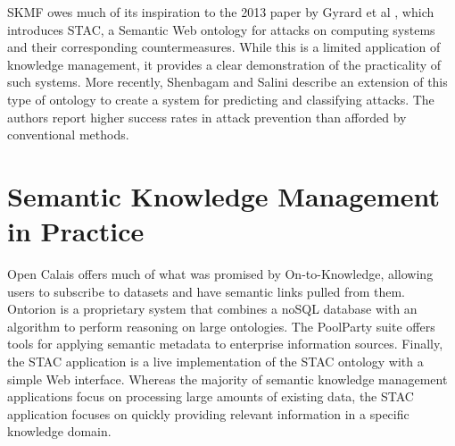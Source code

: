 SKMF owes much of its inspiration to the 2013 paper by Gyrard et al
\cite{ontosec},
which introduces STAC, a Semantic Web ontology for attacks on computing systems and their corresponding countermeasures. While this is a limited application of knowledge management, it provides a clear demonstration of the practicality of such systems. More recently, Shenbagam and Salini
\cite{vulncontol}
describe an extension of this type of ontology to create a system for predicting and classifying attacks. The authors report higher success rates in attack prevention than afforded by conventional methods.


\section{Semantic Knowledge Management in Practice}
\label{applications}

Open Calais
\cite{opencalais}
offers much of what was promised by On-to-Knowledge, allowing users to subscribe to datasets and have semantic links pulled from them. Ontorion
\cite{ontorion}
is a proprietary system that combines a noSQL database with an algorithm to perform reasoning on large ontologies. The PoolParty suite
\cite{poolparty}
offers tools for applying semantic metadata to enterprise information sources. Finally, the STAC application
\cite{stacweb}
is a live implementation of the STAC ontology with a simple Web interface. Whereas the majority of semantic knowledge management applications focus on processing large amounts of existing data, the STAC application focuses on quickly providing relevant information in a specific knowledge domain.
